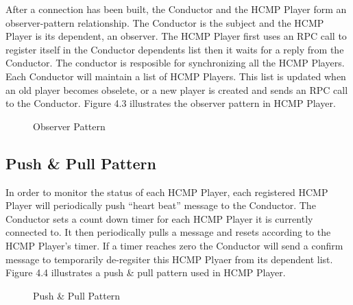 After a connection has been built, the Conductor and the HCMP Player form an 
observer-pattern relationship. The Conductor is the subject and the HCMP Player 
is its dependent, an observer. The HCMP Player first uses an RPC call to register 
itself in the Conductor dependents list then it waits for a reply from the Conductor. 
The conductor is resposible for synchronizing all the HCMP Players. Each Conductor 
will maintain a list of HCMP Players. This list is updated when an old player becomes 
obselete, or a new player is created and sends an RPC call to the Conductor.
Figure 4.3 illustrates the observer pattern in HCMP Player.  
\begin{figure}[H]
\caption{Observer Pattern}
\label{fig:speciation}
\end{figure}

\subsection{Push \& Pull Pattern}
In order to monitor the status of each HCMP Player, each registered HCMP Player 
will periodically push ``heart beat'' message to the Conductor.
The Conductor sets a count down timer for each HCMP Player it is currently 
connected to. It then periodically pulls a message and resets according to the 
HCMP Player's timer. If a timer reaches zero the Conductor will send a confirm 
message to temporarily de-regsiter this HCMP Plyaer from its dependent list. 
Figure 4.4 illustrates a push \& pull pattern used in HCMP Player.

\begin{figure}[H]
\caption{Push \& Pull Pattern}
\label{fig:speciation}
\end{figure}

